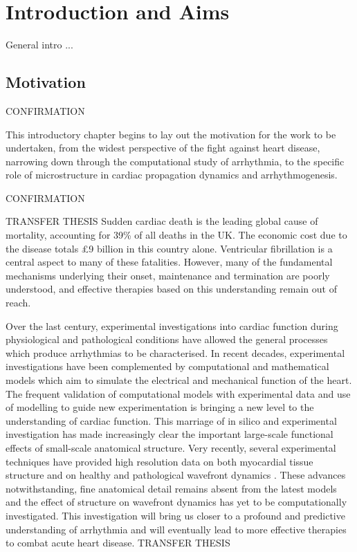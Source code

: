 \chapter{Introduction and Aims}
\dblspace

General intro ...

\section{Motivation}
\label{sec:intro:motivation}
CONFIRMATION

      This introductory chapter begins to lay out the motivation for the work to be undertaken, from the widest perspective of the fight against heart disease, narrowing down through the computational study of arrhythmia, to the specific role of microstructure in cardiac propagation dynamics and arrhythmogenesis.
      
CONFIRMATION

TRANSFER THESIS
  Sudden cardiac death is the leading global cause of mortality, accounting for 39\% of all deaths in the UK. The economic cost due to the disease totals \pounds9 billion in this country alone. Ventricular fibrillation is a central aspect to many of these fatalities. However, many of the fundamental mechanisms underlying their onset, maintenance and termination are poorly understood, and effective therapies based on this understanding remain out of reach.
  
  Over the last century, experimental investigations into cardiac function during physiological and pathological conditions have allowed the general processes which produce arrhythmias to be characterised. In recent decades, experimental investigations have been complemented by computational and mathematical models which aim to simulate the electrical and mechanical function of the heart. The frequent validation of computational models with experimental data and use of modelling to guide new experimentation is bringing a new level to the understanding of cardiac function. This marriage of in silico and experimental investigation has made increasingly clear the important large-scale functional effects of small-scale anatomical structure. Very recently, several experimental techniques have provided high resolution data on both myocardial tissue structure and on healthy and pathological wavefront dynamics \cite{Burton2006,Plank2009,Bishop2009}. These advances notwithstanding, fine anatomical detail remains absent from the latest models and the effect of structure on wavefront dynamics has yet to be computationally investigated. This investigation will bring us closer to a profound and predictive understanding of arrhythmia and will eventually lead to more effective therapies to combat acute heart disease.
TRANSFER THESIS

